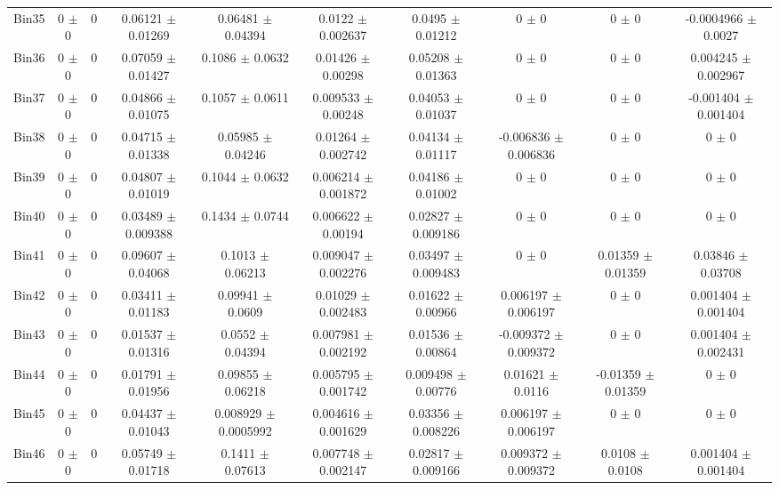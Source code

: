 \begin{tabular}{@{\extracolsep{4pt}}lccccccccc@{}}
     Bin35 & 0 $\pm$ 0 & 0 & 0.06121 $\pm$ 0.01269 & 0.06481 $\pm$ 0.04394 & 0.0122 $\pm$ 0.002637 & 0.0495 $\pm$ 0.01212 & 0 $\pm$ 0 & 0 $\pm$ 0 & -0.0004966 $\pm$ 0.0027 \\ 
     Bin36 & 0 $\pm$ 0 & 0 & 0.07059 $\pm$ 0.01427 & 0.1086 $\pm$ 0.0632 & 0.01426 $\pm$ 0.00298 & 0.05208 $\pm$ 0.01363 & 0 $\pm$ 0 & 0 $\pm$ 0 & 0.004245 $\pm$ 0.002967 \\ 
     Bin37 & 0 $\pm$ 0 & 0 & 0.04866 $\pm$ 0.01075 & 0.1057 $\pm$ 0.0611 & 0.009533 $\pm$ 0.00248 & 0.04053 $\pm$ 0.01037 & 0 $\pm$ 0 & 0 $\pm$ 0 & -0.001404 $\pm$ 0.001404 \\ 
     Bin38 & 0 $\pm$ 0 & 0 & 0.04715 $\pm$ 0.01338 & 0.05985 $\pm$ 0.04246 & 0.01264 $\pm$ 0.002742 & 0.04134 $\pm$ 0.01117 & -0.006836 $\pm$ 0.006836 & 0 $\pm$ 0 & 0 $\pm$ 0 \\ 
     Bin39 & 0 $\pm$ 0 & 0 & 0.04807 $\pm$ 0.01019 & 0.1044 $\pm$ 0.0632 & 0.006214 $\pm$ 0.001872 & 0.04186 $\pm$ 0.01002 & 0 $\pm$ 0 & 0 $\pm$ 0 & 0 $\pm$ 0 \\ 
     Bin40 & 0 $\pm$ 0 & 0 & 0.03489 $\pm$ 0.009388 & 0.1434 $\pm$ 0.0744 & 0.006622 $\pm$ 0.00194 & 0.02827 $\pm$ 0.009186 & 0 $\pm$ 0 & 0 $\pm$ 0 & 0 $\pm$ 0 \\ 
     Bin41 & 0 $\pm$ 0 & 0 & 0.09607 $\pm$ 0.04068 & 0.1013 $\pm$ 0.06213 & 0.009047 $\pm$ 0.002276 & 0.03497 $\pm$ 0.009483 & 0 $\pm$ 0 & 0.01359 $\pm$ 0.01359 & 0.03846 $\pm$ 0.03708 \\ 
     Bin42 & 0 $\pm$ 0 & 0 & 0.03411 $\pm$ 0.01183 & 0.09941 $\pm$ 0.0609 & 0.01029 $\pm$ 0.002483 & 0.01622 $\pm$ 0.00966 & 0.006197 $\pm$ 0.006197 & 0 $\pm$ 0 & 0.001404 $\pm$ 0.001404 \\ 
     Bin43 & 0 $\pm$ 0 & 0 & 0.01537 $\pm$ 0.01316 & 0.0552 $\pm$ 0.04394 & 0.007981 $\pm$ 0.002192 & 0.01536 $\pm$ 0.00864 & -0.009372 $\pm$ 0.009372 & 0 $\pm$ 0 & 0.001404 $\pm$ 0.002431 \\ 
     Bin44 & 0 $\pm$ 0 & 0 & 0.01791 $\pm$ 0.01956 & 0.09855 $\pm$ 0.06218 & 0.005795 $\pm$ 0.001742 & 0.009498 $\pm$ 0.00776 & 0.01621 $\pm$ 0.0116 & -0.01359 $\pm$ 0.01359 & 0 $\pm$ 0 \\ 
     Bin45 & 0 $\pm$ 0 & 0 & 0.04437 $\pm$ 0.01043 & 0.008929 $\pm$ 0.0005992 & 0.004616 $\pm$ 0.001629 & 0.03356 $\pm$ 0.008226 & 0.006197 $\pm$ 0.006197 & 0 $\pm$ 0 & 0 $\pm$ 0 \\ 
     Bin46 & 0 $\pm$ 0 & 0 & 0.05749 $\pm$ 0.01718 & 0.1411 $\pm$ 0.07613 & 0.007748 $\pm$ 0.002147 & 0.02817 $\pm$ 0.009166 & 0.009372 $\pm$ 0.009372 & 0.0108 $\pm$ 0.0108 & 0.001404 $\pm$ 0.001404 \\ 

\end{tabular}

